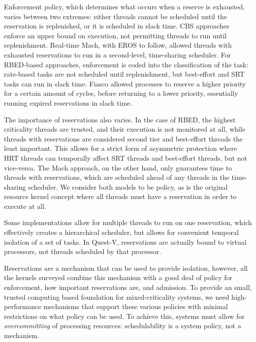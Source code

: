 Enforcement policy, which determines what occurs when a reserve is exhausted,
varies between two extremes: either threads cannot be scheduled until the reservation is
replenished, or it is scheduled in slack time. 
\gls{CBS} approaches enforce an upper bound on execution, not permitting threads to run until 
replenishment. Real-time Mach, with EROS to follow, allowed threads with exhausted reservations to
run in a second-level, time-sharing scheduler. For RBED-based approaches, enforcement is coded into
the classification of the task: rate-based tasks are not scheduled until replenishment, but
best-effort and \gls{SRT} tasks can run in slack time. 
Fiasco allowed processes to reserve a 
higher priority for a certain amount of cycles, before returning to a lower priority, essentially
running expired reservations in slack time. 

The importance of reservations also varies. In the case of RBED, the highest criticality threads
are trusted, and their execution is not monitored at all, while threads with reservations are
considered second tier and best-effort threads the least important. This allows for a strict form 
of asymmetric protection where \gls{HRT} threads can temporally affect \gls{SRT} threads and
best-effort threads, but not vice-versa. The Mach approach, on the other hand, only guarantees time
to threads with reservations, which are scheduled ahead of any threads in the time-sharing
scheduler. We consider both models to be policy, as is the original resource kernel concept where
all threads must have a reservation in order to execute at all.  

Some implementations allow for multiple threads to run on one reservation, which effectively creates
a hierarchical scheduler, but allows for convenient temporal isolation of a set of tasks. In
Quest-V, reservations are actually bound to virtual processors, not threads scheduled by that
processor. 

\label{p:overcommit}
Reservations are a mechanism that can be used to provide isolation, however, all the kernels
surveyed combine this mechanism with a good deal of policy for enforcement, how important
reservations are, and admission. To provide an small, trusted computing based foundation for
mixed-criticality systems, we need high-performance mechanisms that support these various policies with minimal restrictions on
what policy can be used.
To achieve this, systems must allow for \emph{overcommitting} of processing resources: schedulability is a system 
policy, not a mechanism. 

